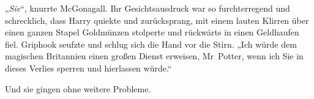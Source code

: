 „\emph{Sie}“, knurrte McGonagall. Ihr Gesichtsausdruck war so furchterregend und schrecklich, dass Harry quiekte und zurücksprang, mit einem lauten Klirren über einen ganzen Stapel Goldmünzen stolperte und rückwärts in einen Geldhaufen fiel. Griphook seufzte und schlug sich die Hand vor die Stirn.
„Ich würde dem magischen Britannien einen großen Dienst erweisen, Mr~Potter, wenn ich Sie in dieses Verlies sperren und hierlassen würde.“

Und sie gingen ohne weitere Probleme.

